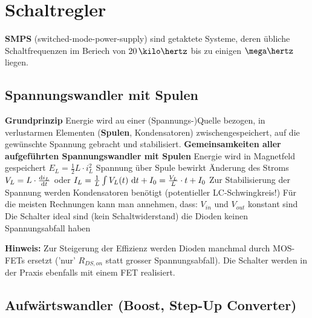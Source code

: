 \section{Schaltregler}

\textbf{SMPS} (switched-mode-power-supply) sind getaktete Systeme, deren übliche Schaltfrequenzen im Beriech von 
$20 \, \kilo \hertz$ bis zu einigen $\mega \hertz$ liegen.


\subsection{Spannungswandler mit Spulen}

\begin{outline}
    \1 \textbf{Grundprinzip}
        \2 Energie wird au einer (Spannungs-)Quelle bezogen, in verlustarmen Elementen (\textbf{Spulen}, Kondensatoren) 
            zwischengespeichert, auf die gewünschte Spannung gebracht und stabilisiert.
    \1 \textbf{Gemeinsamkeiten aller aufgeführten Spannungswandler mit Spulen}
        \2 Energie wird in Magnetfeld gespeichert $E_L = \frac{1}{2} L \cdot i_L^2$
        \2 Spannung über Spule bewirkt Änderung des Stroms \\
            $V_L = L \cdot \frac{\mathop{} \! \mathrm{d} i_L}{\mathop{} \! \mathrm{d} t}$ oder $I_L= \frac{1}{L} \int V_L(t) \, \mathop{} \! \mathrm{d} t + I_0  = \frac{V_L}{L} \cdot t + I_0$ 
        \2 Zur Stabilisierung der Spannung werden Kondensatoren benötigt (potentieller LC-Schwingkreis!)
        \2 Für die meisten Rechnungen kann man annehmen, dass:
            \3 $V_{in}$ und $V_{out}$ konstant sind
            \3 Die Schalter ideal sind (kein Schaltwiderstand)
            \3 die Dioden keinen Spannungsabfall haben
\end{outline}

\textbf{Hinweis:} Zur Steigerung der Effizienz werden Dioden manchmal durch MOS-FETs ersetzt ('nur' $R_{DS,on}$ statt grosser
Spannungsabfall). Die Schalter werden in der Praxis ebenfalls mit einem FET realisiert.


\subsection{Aufwärtswandler (Boost, Step-Up Converter)}

\begin{minipage}[c]{0.4\columnwidth}
    
\end{minipage}
\hfill
\begin{minipage}[c]{0.58\columnwidth}
    
\end{minipage}

